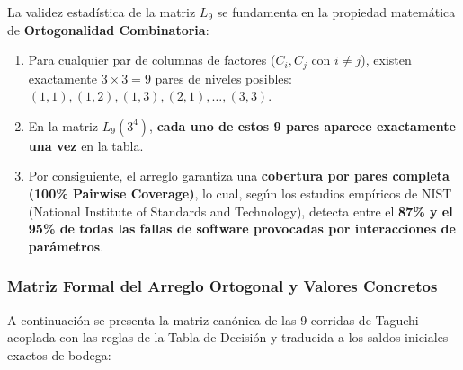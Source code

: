\documentclass[11pt,a4paper]{article}
\begin{document}
\begin{tcolorbox}[colback=accentgreen!10,colframe=accentgreen,title=\textbf{Demostración de Validez Matemática de la Muestra $L_9(3^4)$}]
\small
La validez estadística de la matriz $L_9$ se fundamenta en la propiedad matemática de \textbf{Ortogonalidad Combinatoria}:
\begin{enumerate}[noitemsep]
    \item Para cualquier par de columnas de factores ($C_i, C_j$ con $i \ne j$), existen exactamente $3 \times 3 = 9$ pares de niveles posibles: $(1,1), (1,2), (1,3), (2,1), \dots, (3,3)$.
    \item En la matriz $L_9(3^4)$, \textbf{cada uno de estos 9 pares aparece exactamente una vez} en la tabla.
    \item Por consiguiente, el arreglo garantiza una \textbf{cobertura por pares completa (100\% Pairwise Coverage)}, lo cual, según los estudios empíricos de NIST (National Institute of Standards and Technology), detecta entre el \textbf{87\% y el 95\% de todas las fallas de software provocadas por interacciones de parámetros}.
\end{enumerate}
\end{tcolorbox}

\subsubsection{Matriz Formal del Arreglo Ortogonal y Valores Concretos}
A continuación se presenta la matriz canónica de las 9 corridas de Taguchi acoplada con las reglas de la Tabla de Decisión y traducida a los saldos iniciales exactos de bodega:
\end{document}
